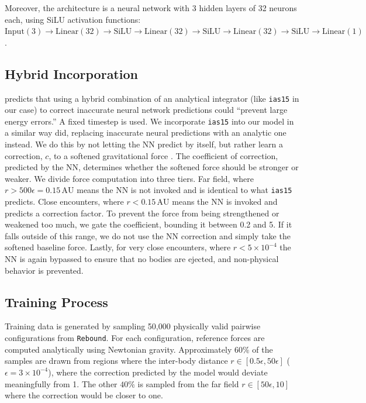 \documentclass[12pt]{article}
\begin{document}
Moreover, the architecture is a neural network with 3 hidden layers of 32 neurons each, using SiLU activation functions:
$\text{Input}(3) \to \text{Linear}(32) \to \text{SiLU} \to \text{Linear}(32) \to \text{SiLU} \to \text{Linear}(32) \to \text{SiLU} \to \text{Linear}(1)$.

\subsection{Hybrid Incorporation}
\cite{ulibarrena2024hybrid} predicts that using a hybrid combination of an analytical integrator (like \texttt{ias15} in our case) to correct inaccurate neural network predictions could ``prevent large energy errors.'' A fixed timestep is used. We incorporate \texttt{ias15} into our model in a similar way \cite{ulibarrena2024hybrid} did, replacing inaccurate neural predictions with an analytic one instead. We do this by not letting the NN predict by itself, but rather learn a correction, $c$, to a softened gravitational force \cite{kipf2018neural}. The coefficient of correction, predicted by the NN, determines whether the softened force should be stronger or weaker. We divide force computation into three tiers. Far field, where $r > 500\epsilon = 0.15\,\text{AU}$ means the NN is not invoked and is identical to what \texttt{ias15} predicts. Close encounters, where $r < 0.15\,\text{AU}$ means the NN is invoked and predicts a correction factor. To prevent the force from being strengthened or weakened too much, we gate the coefficient, bounding it between 0.2 and 5. If it falls outside of this range, we do not use the NN correction and simply take the softened baseline force. Lastly, for very close encounters, where $r < 5\times10^{-4}$ the NN is again bypassed to ensure that no bodies are ejected, and non-physical behavior is prevented.

\subsection{Training Process}
\label{sec:training}
Training data is generated by sampling 50,000 physically valid pairwise configurations from \texttt{Rebound}. For each configuration, reference forces are computed analytically using Newtonian gravity. Approximately $60\%$ of the samples are drawn from regions where the inter-body distance $r\in [0.5 \epsilon, 50 \epsilon]$ ($\epsilon = 3 \times10^{-4}$), where the correction predicted by the model would deviate meaningfully from 1. The other $40\%$ is sampled from the far field $r\in[50\epsilon, 10]$ where the correction would be closer to one.
\end{document}
